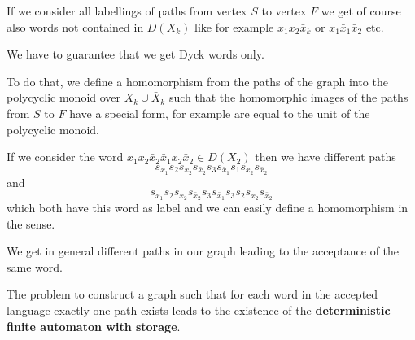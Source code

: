 \begin{center}
\end{center}

If we consider all labellings of paths from vertex $S$ to vertex $F$ we get of
course also words not contained in $D(X_k)$ like for example $x_1 x_2
\bar{x}_k$ or $x_1 \bar{x}_1 \bar{x}_2$ etc.

We have to guarantee that we get Dyck words only. 

To do that, we define a homomorphism from the paths of the graph into the
polycyclic monoid over $X_k \cup \bar{X}_k$ such that the homomorphic images of the paths 
from $S$ to $F$ have a special form, for example are equal to the unit of the
polycyclic monoid.

If we consider the word $ x_1 x_2 \bar{x}_2 \bar{x}_1 x_2 \bar{x}_2 \in D(X_2)$
then we have different paths 
\[s_{x_1} s_2 s_{x_2} s_{\bar{x}_2} s_3 s_{\bar{x}_1} s_1 s_{x_2} s_{\bar{x}_2} \] 
and 
\[s_{x_1} s_2 s_{x_2} s_{\bar{x}_2} s_3 s_{\bar{x}_1} s_3 s_2 s_{x_2}
s_{\bar{x}_2}\] 
which both have this word as label and we can easily define a homomorphism in
the sense.

We get in general different paths in our graph leading to the acceptance of the
same word.

The problem to construct a graph such that for each word in the accepted
language exactly one path exists leads to the existence of the {\bf
deterministic finite automaton with storage}.

